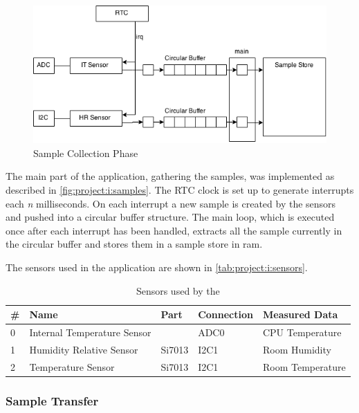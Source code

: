 \begin{figure}[H]
  \begin{center}
    \includegraphics[scale=0.5]{figures/project-i.png}
  \end{center}
  \caption{Sample Collection Phase}
  \label{fig:project:i:samples}
\end{figure}
The main part of the application, gathering the samples, was implemented as described in \autoref{fig:project:i:samples}.
The RTC clock is set up to generate interrupts each \emph{n} milliseconds.
On each interrupt a new sample is created by the sensors and pushed into a circular buffer structure.
The main loop, which is executed once after each interrupt has been handled, extracts all the sample currently in the circular buffer and stores them in a sample store in \gls{ram}.

The sensors used in the application are shown in \autoref{tab:project:i:sensors}.

\begin{table}[H]
  \centering
  \begin{tabular}{ l | l | l | l | l }
    \textbf{\#} & \textbf{Name} & \textbf{Part} & \textbf{Connection} & \textbf{Measured Data} \\
    \hline
    0 & Internal Temperature Sensor & & ADC0 & CPU Temperature \\
    1 & Humidity Relative Sensor & Si7013 & I2C1 & Room Humidity \\
    2 & Temperature Sensor & Si7013 & I2C1 & Room Temperature \\
    \hline
  \end{tabular}
  \caption{Sensors used by the {\tracker}}
  \label{tab:project:i:sensors}
\end{table}

\subsubsection{Sample Transfer}


